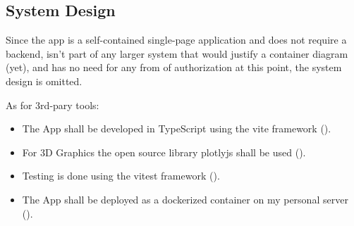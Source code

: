 \subsection{System Design}

Since the app is a self-contained single-page application and does not require a backend, isn’t part of any larger system that would justify a container diagram (yet), and has no need for any from of authorization at this point, the system design is omitted.

As for 3rd-pary tools:
\begin{itemize}
    \item The App shall be developed in TypeScript using the vite framework (\cite{Vite}).

    \item For 3D Graphics the open source library plotlyjs shall be used (\cite{PlotlyJS}).

    \item Testing is done using the vitest framework (\cite{Vitest}).

    \item The App shall be deployed as a dockerized container on my personal server (\cite{Docker}).
\end{itemize}